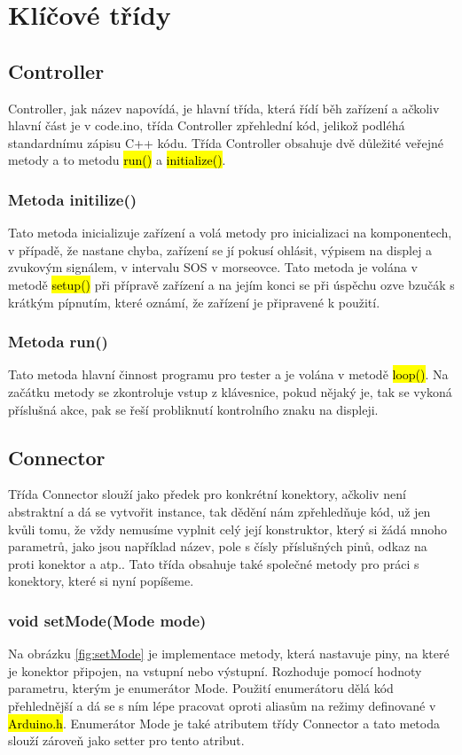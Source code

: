 
\section{Klíčové třídy}
\subsection{Controller}
Controller, jak název napovídá, je hlavní třída, která řídí běh zařízení a ačkoliv hlavní část je v code.ino, třída Controller zpřehlední kód, jelikož podléhá standardnímu zápisu C++ kódu. Třída Controller obsahuje dvě důležité veřejné metody a to metodu \hl{run()} a \hl{initialize()}.

\subsubsection{Metoda initilize()}
Tato metoda inicializuje zařízení a volá metody pro inicializaci na komponentech, v případě, že nastane chyba, zařízení se jí pokusí ohlásit, výpisem na displej a zvukovým signálem, v intervalu SOS v morseovce. Tato metoda je volána v metodě \hl{setup()} při přípravě zařízení a na jejím konci se při úspěchu ozve bzučák s krátkým pípnutím, které oznámí, že zařízení je připravené k použití.

\subsubsection{Metoda run()}
Tato metoda hlavní činnost programu pro tester a je volána v metodě \hl{loop()}. Na začátku metody se zkontroluje vstup z klávesnice, pokud nějaký je, tak se vykoná příslušná akce, pak se řeší probliknutí kontrolního znaku na displeji.

\subsection{Connector}
Třída Connector slouží jako předek pro konkrétní konektory, ačkoliv není abstraktní a dá se vytvořit instance, tak dědění nám zpřehledňuje kód, už jen kvůli tomu, že vždy nemusíme vyplnit celý její konstruktor, který si žádá mnoho parametrů, jako jsou například název, pole s čísly příslušných pinů, odkaz na proti konektor a atp.. Tato třída obsahuje také společné metody pro práci s konektory, které si nyní popíšeme.

\subsubsection{void setMode(Mode mode)}
Na obrázku \ref{fig:setMode} je implementace metody, která nastavuje piny, na které je konektor připojen, na vstupní nebo výstupní.  Rozhoduje pomocí hodnoty parametru, kterým je enumerátor Mode. Použití enumerátoru dělá kód přehlednější a dá se s ním lépe pracovat oproti aliasům na režimy definované v \hl{Arduino.h}. Enumerátor Mode je také atributem třídy Connector a tato metoda slouží zároveň jako setter pro tento atribut.


